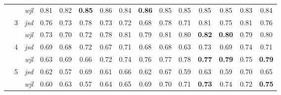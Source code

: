 \begin{table}[ht]
{{\begin{tabular}{ccccccccccccccc}
\multicolumn{1}{c|}{} &  & \multicolumn{1}{c|}{\textit{wjl}} & 0.81 & \multicolumn{1}{c|}{0.82} & \cellcolor{gray!25}\textbf{0.85} & \multicolumn{1}{c|}{\cellcolor{gray!25}0.86} & 0.84 & \multicolumn{1}{c|}{\textbf{0.86}} & 0.85 & \multicolumn{1}{c|}{0.85} & 0.85 & \multicolumn{1}{c|}{0.85} & 0.83 & \multicolumn{1}{c|}{0.84} \\ \cline{2-15} 
\multicolumn{1}{c|}{} & \multirow{2}{*}{3} & \multicolumn{1}{c|}{\textit{jsd}} & 0.76 & \multicolumn{1}{c|}{0.73} & 0.78 & \multicolumn{1}{c|}{0.73} & \cellcolor{gray!25}0.72 & \multicolumn{1}{c|}{\cellcolor{gray!25}0.68} & 0.78 & \multicolumn{1}{c|}{0.71} & 0.81 & \multicolumn{1}{c|}{0.75} & 0.81 & \multicolumn{1}{c|}{0.76} \\
\multicolumn{1}{c|}{} &  & \multicolumn{1}{c|}{\textit{wjl}} & 0.73 & \multicolumn{1}{c|}{0.70} & 0.72 & \multicolumn{1}{c|}{0.78} & \cellcolor{gray!25}0.81 & \multicolumn{1}{c|}{\cellcolor{gray!25}0.79} & 0.81 & \multicolumn{1}{c|}{0.80} & \textbf{0.82} & \multicolumn{1}{c|}{\textbf{0.80}} & 0.79 & \multicolumn{1}{c|}{0.80} \\ \cline{2-15} 
\multicolumn{1}{c|}{} & \multirow{2}{*}{4} & \multicolumn{1}{c|}{\textit{jsd}} & 0.69 & \multicolumn{1}{c|}{0.68} & 0.72 & \multicolumn{1}{c|}{0.67} & 0.71 & \multicolumn{1}{c|}{0.68} & \cellcolor{gray!25}0.68 & \multicolumn{1}{c|}{\cellcolor{gray!25}0.63} & 0.73 & \multicolumn{1}{c|}{0.69} & 0.74 & \multicolumn{1}{c|}{0.71} \\
\multicolumn{1}{c|}{} &  & \multicolumn{1}{c|}{\textit{wjl}} & 0.63 & \multicolumn{1}{c|}{0.69} & 0.66 & \multicolumn{1}{c|}{0.72} & 0.74 & \multicolumn{1}{c|}{0.76} & \cellcolor{gray!25}0.77 & \multicolumn{1}{c|}{\cellcolor{gray!25}0.78} & \textbf{0.77} & \multicolumn{1}{c|}{\textbf{0.79}} & 0.75 & \multicolumn{1}{c|}{\textbf{0.79}} \\ \cline{2-15} 
\multicolumn{1}{c|}{} & \multirow{2}{*}{5} & \multicolumn{1}{c|}{\textit{jsd}} & 0.62 & \multicolumn{1}{c|}{0.57} & 0.69 & \multicolumn{1}{c|}{0.61} & 0.66 & \multicolumn{1}{c|}{0.62} & 0.67 & \multicolumn{1}{c|}{0.59} & \cellcolor{gray!25}0.63 & \multicolumn{1}{c|}{\cellcolor{gray!25}0.59} & 0.70 & \multicolumn{1}{c|}{0.65} \\
\multicolumn{1}{c|}{} &  & \multicolumn{1}{c|}{\textit{wjl}} & 0.60 & \multicolumn{1}{c|}{0.63} & 0.57 & \multicolumn{1}{c|}{0.64} & 0.65 & \multicolumn{1}{c|}{0.69} & 0.70 & \multicolumn{1}{c|}{0.71} & \cellcolor{gray!25}\textbf{0.73} & \multicolumn{1}{c|}{\cellcolor{gray!25}0.74} & 0.72 & \multicolumn{1}{c|}{\textbf{0.75}} \\ \cline{2-15} 

\end{tabular}}}
\end{table}
